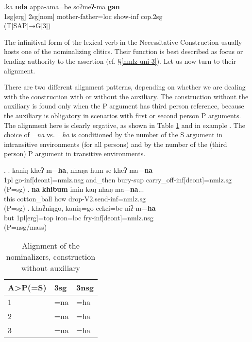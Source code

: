 \exg.ka \textbf{nda} appa-ama=be soʔmeʔ-ma \textbf{gan}\\
		 {\sc 1sg[erg]}  {\sc 2sg[nom]}  mother-father{\sc =loc} show{\sc -inf} {\sc cop.2sg}\\
		 (T[SAP]→G[3])
		


The infinitival form of the lexical verb  in the Necessitative Construction usually hosts one of the nominalizing clitics. Their  function is best described as focus or lending authority to the assertion (cf. §\ref{nmlz-uni-3}). Let us now turn to their alignment. 

There are two different alignment patterns, depending on whether we are dealing with the construction  with or without the auxiliary. The construction without the auxiliary is  found only when the P argument has third person reference, because the auxiliary is obligatory in scenarios with first or second person P arguments. The  alignment here is clearly ergative, as shown in Table \ref{nom-align-without} and in example \Next. The choice of \emph{=na} vs. \emph{=ha} is conditioned by the number of the S argument in intransitive environments (for all persons) and by the number of the (third person) P argument in transitive environments. 


\ex. \ag. kaniŋ kheʔ-m{\bf =ha},                       nhaŋa   hum-se         kheʔ-ma{\bf =na}\\
{\sc 1pl} go{\sc -inf[deont]=nmlz.nsg} and\_then bury{\sc -sup} carry\_off{\sc -inf[deont]=nmlz.sg}\\
 (P=sg) 
\bg. {\bf na}   {\bf khibum}  imin kaŋ-nhaŋ-ma{\bf =na}...\\
this cotton\_ball how drop-{\sc V2.send-inf=nmlz.sg} \\
 (P=sg)  
\bg.  khaʔniŋgo, kaniŋ=go       cekci=be    niʔ-m{\bf =ha} \\
but {\sc 1pl[erg]=top}  iron{\sc =loc} fry-{\sc inf[deont]=nmlz.nsg} \\
 (P=nsg/mass) 


\begin{table}[htp]
\begin{center}
\begin{tabular}{lll}
\lsptoprule
{\bf A>P(=S)} 	&	{\sc 3sg}&{\sc 3nsg}\\
\hline
\hline
1		&=na &  =ha\\
\hline
2		&=na& =ha\\
\hline 
3		&=na&=ha\\
\end{tabular}
\caption{Alignment of the nominalizers, construction without auxiliary}\label{nom-align-without}
\end{center}
\end{table}
 
